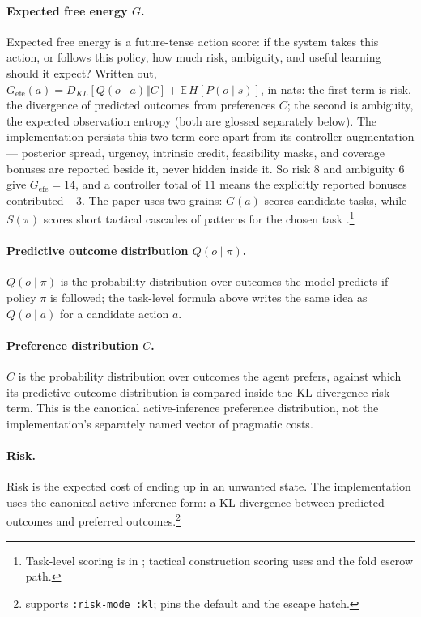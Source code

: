 \paragraph{Expected free energy $G$.} Expected free energy is a future-tense action score: if the system takes this action, or follows this policy, how much risk, ambiguity, and useful learning should it expect?  Written out, $G_{\mathrm{efe}}(a) = D_{KL}[Q(o\mid a)\Vert C] + \mathbb{E}\,H[P(o\mid s)]$, in nats: the first term is risk, the divergence of predicted outcomes from preferences $C$; the second is ambiguity, the expected observation entropy (both are glossed separately below).  The implementation persists this two-term core apart from its controller augmentation --- posterior spread, urgency, intrinsic credit, feasibility masks, and coverage bonuses are reported beside it, never hidden inside it.  So risk $8$ and ambiguity $6$ give $G_{\mathrm{efe}}=14$, and a controller total of $11$ means the explicitly reported bonuses contributed $-3$.  The paper uses two grains: $G(a)$ scores candidate tasks, while $S(\pi)$ scores short tactical cascades of patterns for the chosen task \cite{FRISTON2016862,neacsu2024structure}.\footnote{Task-level scoring is in ; tactical construction scoring uses  and the fold escrow path.}

\paragraph{Predictive outcome distribution $Q(o\mid\pi)$.} $Q(o\mid\pi)$ is the probability distribution over outcomes the model predicts if policy $\pi$ is followed; the task-level formula above writes the same idea as $Q(o\mid a)$ for a candidate action $a$.

\paragraph{Preference distribution $C$.} $C$ is the probability distribution over outcomes the agent prefers, against which its predictive outcome distribution is compared inside the KL-divergence risk term.  This is the canonical active-inference preference distribution, not the implementation's separately named vector of pragmatic costs.

\paragraph{Risk.} Risk is the expected cost of ending up in an unwanted state.  The implementation uses the canonical active-inference form: a KL divergence between predicted outcomes and preferred outcomes.\footnote{ supports \texttt{:risk-mode :kl};  pins the default and the escape hatch.}


